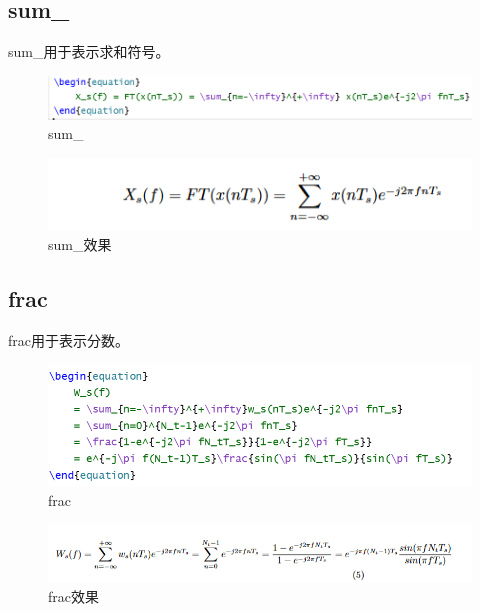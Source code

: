 \documentclass{article}
\begin{document}
\subsection{sum_}
sum\_用于表示求和符号。
\begin{figure}[H]
    \centering
    \includegraphics[width=1\linewidth]{sum_.png}
    \caption{sum_}
\end{figure}

\begin{figure}[H]
    \centering
    \includegraphics[width=1\linewidth]{sum_2.png}
    \caption{sum_效果}
\end{figure}

\subsection{frac}
frac用于表示分数。
\begin{figure}[H]
    \centering
    \includegraphics[width=1\linewidth]{frac1.png}
    \caption{frac}
\end{figure}

\begin{figure}[H]
    \centering
    \includegraphics[width=1\linewidth]{frac2.png}
    \caption{frac效果}
\end{figure}
\end{document}
